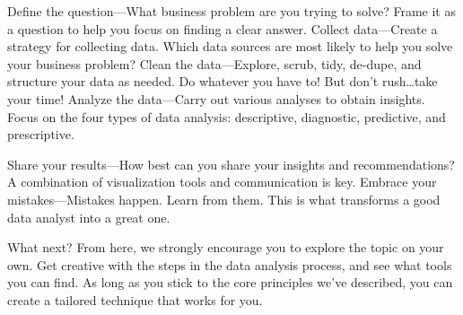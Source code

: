 Define the question—What business problem are you trying to solve? Frame it as a question to help you focus on finding a clear answer.
Collect data—Create a strategy for collecting data. Which data sources are most likely to help you solve your business problem?
Clean the data—Explore, scrub, tidy, de-dupe, and structure your data as needed. Do whatever you have to! But don’t rush…take your time!
Analyze the data—Carry out various analyses to obtain insights. Focus on the four types of data analysis: descriptive, diagnostic, predictive, and prescriptive.

Share your results—How best can you share your insights and recommendations? A combination of visualization tools and communication is key.
Embrace your mistakes—Mistakes happen. Learn from them. This is what transforms a good data analyst into a great one.

What next? From here, we strongly encourage you to explore the topic on your own. Get creative with the steps in the data analysis process, and see what tools you can find. As long as you stick to the core principles we’ve described, you can create a tailored technique that works for you.